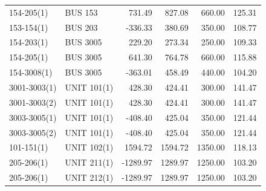 \documentclass[10pt]{report}
\begin{document}
\begin{table}[H]
{\begin{tabular}{llrrrr}
154-205(1) & BUS 153 & 731.49 & 827.08 & 660.00 & 125.31 \\
153-154(1) & BUS 203 & -336.33 & 380.69 & 350.00 & 108.77 \\
154-203(1) & BUS 3005 & 229.20 & 273.34 & 250.00 & 109.33 \\
154-205(1) & BUS 3005 & 641.30 & 764.78 & 660.00 & 115.88 \\
154-3008(1) & BUS 3005 & -363.01 & 458.49 & 440.00 & 104.20 \\
3001-3003(1) & UNIT 101(1) & 428.30 & 424.41 & 300.00 & 141.47 \\
3001-3003(2) & UNIT 101(1) & 428.30 & 424.41 & 300.00 & 141.47 \\
3003-3005(1) & UNIT 101(1) & -408.40 & 425.04 & 350.00 & 121.44 \\
3003-3005(2) & UNIT 101(1) & -408.40 & 425.04 & 350.00 & 121.44 \\
101-151(1) & UNIT 102(1) & 1594.72 & 1594.72 & 1350.00 & 118.13 \\
205-206(1) & UNIT 211(1) & -1289.97 & 1289.97 & 1250.00 & 103.20 \\
205-206(1) & UNIT 212(1) & -1289.97 & 1289.97 & 1250.00 & 103.20 \\
\bottomrule
\end{tabular}}
\end{table}
\end{document}
